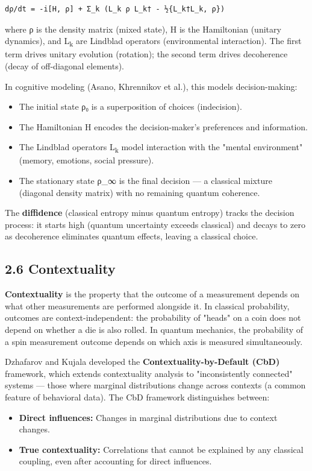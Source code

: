 \documentclass[11pt]{article}
\begin{document}
\begin{verbatim}
dρ/dt = -i[H, ρ] + Σ_k (L_k ρ L_k† - ½{L_k†L_k, ρ})
\end{verbatim}

where ρ is the density matrix (mixed state), H is the Hamiltonian (unitary
dynamics), and L\textsubscript{k} are Lindblad operators (environmental interaction). The first
term drives unitary evolution (rotation); the second term drives decoherence
(decay of off-diagonal elements).

In cognitive modeling (Asano, Khrennikov et al.), this models decision-making:
\begin{itemize}
\item The initial state ρ₀ is a superposition of choices (indecision).
\item The Hamiltonian H encodes the decision-maker's preferences and information.
\item The Lindblad operators L\textsubscript{k} model interaction with the "mental environment"
(memory, emotions, social pressure).
\item The stationary state ρ\_∞ is the final decision --- a classical mixture
(diagonal density matrix) with no remaining quantum coherence.
\end{itemize}

The \textbf{diffidence} (classical entropy minus quantum entropy) tracks the decision
process: it starts high (quantum uncertainty exceeds classical) and decays to zero
as decoherence eliminates quantum effects, leaving a classical choice.
\subsection{2.6 Contextuality}
\label{sec:orgf099a5b}

\textbf{Contextuality} is the property that the outcome of a measurement depends on what
other measurements are performed alongside it. In classical probability, outcomes
are context-independent: the probability of "heads" on a coin does not depend on
whether a die is also rolled. In quantum mechanics, the probability of a spin
measurement outcome depends on which axis is measured simultaneously.

Dzhafarov and Kujala developed the \textbf{Contextuality-by-Default (CbD)} framework,
which extends contextuality analysis to "inconsistently connected" systems --- those
where marginal distributions change across contexts (a common feature of behavioral
data). The CbD framework distinguishes between:
\begin{itemize}
\item \textbf{Direct influences:} Changes in marginal distributions due to context changes.
\item \textbf{True contextuality:} Correlations that cannot be explained by any classical
coupling, even after accounting for direct influences.
\end{itemize}
\end{document}
